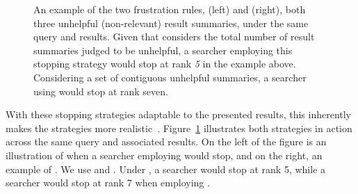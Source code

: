 \begin{figure}[t!]
    \centering
    \caption[Examples of frustration rules  and ]{An example of the two frustration rules,  (left) and  (right), both three unhelpful (non-relevant) result summaries, under the same query and results. Given that  considers the total number of result summaries judged to be unhelpful, a searcher employing this stopping strategy would stop at rank \emph{5} in the example above. Considering a set of contiguous unhelpful summaries, a searcher using  would stop at rank seven.}
    \label{fig:ss23}
\end{figure}

With these stopping strategies adaptable to the presented results, this inherently makes the strategies more realistic~\citep{moffat2013users_versus_models}. Figure~\ref{fig:ss23} illustrates both strategies in action across the same query and associated results. On the left of the figure is an illustration of when a searcher employing  would stop, and on the right, an example of . We use  and . Under , a searcher would stop at rank 5, while a searcher would stop at rank 7 when employing .

